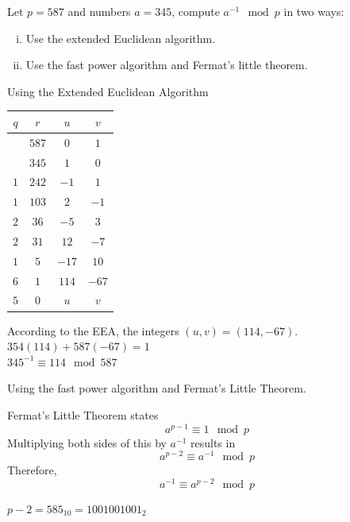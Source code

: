 \documentclass[12pt]{article}
\begin{document}

\problem Let $p=587$ and numbers $a=345$, compute $a^{-1}\mod{p}$ in two
ways:

\begin{enumerate}[(i)]
    \item Use the extended Euclidean algorithm.
    \item Use the fast power algorithm and Fermat’s little theorem.
\end{enumerate}

\solution Using the Extended Euclidean Algorithm

\noindent
\begin{tabular}{|c|c|c|c|}
    \hline
    $q$ & $r$   & $u$   & $v$   \\
    \hline
        & $587$ & $0$   & $1$   \\
        & $345$ & $1$   & $0$   \\
    $1$ & $242$ & $-1$  & $1$   \\
    $1$ & $103$ & $2$   & $-1$  \\
    $2$ & $36$  & $-5$  & $3$   \\
    $2$ & $31$  & $12$  & $-7$  \\
    $1$ & $5$   & $-17$ & $10$  \\
    $6$ & $1$   & $114$ & $-67$ \\
    $5$ & $0$   & $u$   & $v$   \\
    \hline
\end{tabular}

\noindent
According to the EEA, the integers $(u,v)=(114,-67)$.\\
$354(114)+587(-67)=1$\\
$345^{-1}\equiv114\mod{587}$

\newpage
\noindent
Using the fast power algorithm and Fermat's Little Theorem.

\noindent
Fermat's Little Theorem states
\[a^{p-1}\equiv 1\mod{p}\]
Multiplying both sides of this by $a^{-1}$ results in
\[a^{p-2}\equiv a^{-1}\mod{p}\]
Therefore,
\[a^{-1}\equiv a^{p-2}\mod{p}\]

\noindent
$p-2=585_{10}=1001001001_2$
\end{document}

